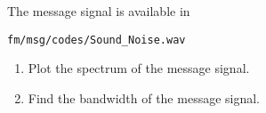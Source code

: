 The message signal is available in 
\begin{lstlisting}
fm/msg/codes/Sound_Noise.wav
\end{lstlisting}
\begin{enumerate}[label=\arabic*.,ref=\thesection.\theenumi]
\item Plot the spectrum of the message signal.
\item Find the bandwidth of the message signal.
\end{enumerate}
